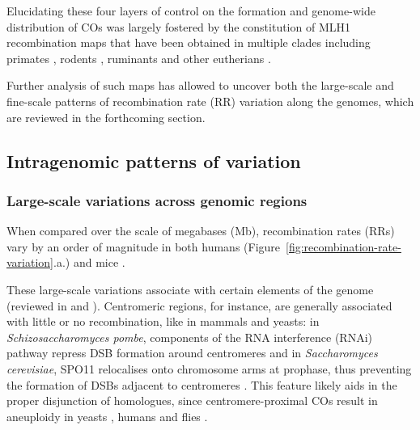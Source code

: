 Elucidating these four layers of control on the formation and genome-wide distribution of COs was largely fostered by the constitution of MLH1 recombination maps \citep[reviewed in][]{capilla2016mammalian} that have been obtained in multiple clades including primates \citep[e.g.][]{sun2005variation,gruhn2013cytological}, rodents \citep[e.g.][]{froenicke2002male,dumont2011genetic}, ruminants \citep[e.g.][]{vozdova2013comparative,sebestova2016effect} and other eutherians \citep[e.g.][]{borodin2008recombination,segurajoana2013evolution,mary2014meiotic}.

Further analysis of such maps has allowed to uncover both the large-scale and fine-scale patterns of recombination rate (RR) variation along the genomes, which are reviewed in the forthcoming section.




\subsection{Intragenomic patterns of variation}

\subsubsection{Large-scale variations across genomic regions}

When compared over the scale of megabases (Mb), recombination rates (RRs) vary by an order of magnitude in both humans (Figure~\ref{fig:recombination-rate-variation}.a.) \citep{nachman2002variation,myers2005finescale} and mice \citep{billings2010patterns, morgan2017structural}.

These large-scale variations associate with certain elements of the genome (reviewed in \citealp{demassy2013initiation} and \citealp{lam2015mechanism}).
Centromeric regions, for instance, are generally associated with little or no recombination, like in mammals \citep{qiao2012interplay} and yeasts: in \textit{Schizosaccharomyces pombe}, components of the RNA interference (RNAi) pathway repress DSB formation around centromeres \citep{ellermeier2010rnai} and in \textit{Saccharomyces cerevisiae}, SPO11 relocalises onto chromosome arms at prophase, thus preventing the formation of DSBs adjacent to centromeres \citep{kugou2009rec8}.
This feature likely aids in the proper disjunction of homologues, since centromere-proximal COs result in aneuploidy in yeasts \citep{rockmill2006centromereproximal}, humans \citep{hassold2001err} and flies \citep{koehler1996recombination}.

